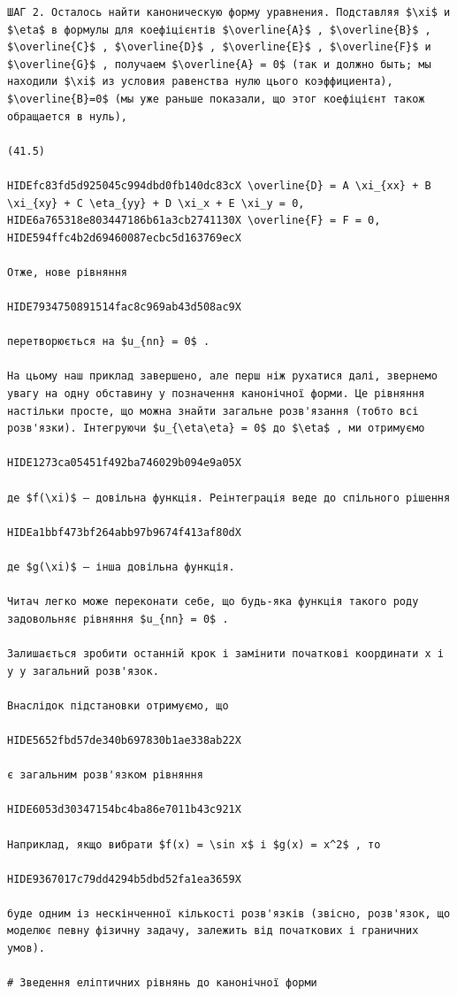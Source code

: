 \documentclass[
  ukrainian,
]{article}
\begin{document}
\begin{verbatim}
ШАГ 2. Осталось найти каноническую форму уравнения. Подставляя $\xi$ и $\eta$ в формулы для коефіцієнтів $\overline{A}$ , $\overline{B}$ , $\overline{C}$ , $\overline{D}$ , $\overline{E}$ , $\overline{F}$ и $\overline{G}$ , получаем $\overline{A} = 0$ (так и должно быть; мы находили $\xi$ из условия равенства нулю цього коэффициента), $\overline{B}=0$ (мы уже раньше показали, що этог коефіцієнт також обращается в нуль),

(41.5)

HIDEfc83fd5d925045c994dbd0fb140dc83cX \overline{D} = A \xi_{xx} + B \xi_{xy} + C \eta_{yy} + D \xi_x + E \xi_y = 0,
HIDE6a765318e803447186b61a3cb2741130X \overline{F} = F = 0,
HIDE594ffc4b2d69460087ecbc5d163769ecX

Отже, нове рівняння

HIDE7934750891514fac8c969ab43d508ac9X

перетворюється на $u_{nn} = 0$ .

На цьому наш приклад завершено, але перш ніж рухатися далі, звернемо увагу на одну обставину у позначення канонічної форми. Це рівняння настільки просте, що можна знайти загальне розв'язання (тобто всі розв'язки). Інтегруючи $u_{\eta\eta} = 0$ до $\eta$ , ми отримуємо

HIDE1273ca05451f492ba746029b094e9a05X

де $f(\xi)$ — довільна функція. Реінтеграція веде до спільного рішення

HIDEa1bbf473bf264abb97b9674f413af80dX

де $g(\xi)$ — інша довільна функція.

Читач легко може переконати себе, що будь-яка функція такого роду задовольняє рівняння $u_{nn} = 0$ .

Залишається зробити останній крок і замінити початкові координати x і y у загальний розв'язок.

Внаслідок підстановки отримуємо, що

HIDE5652fbd57de340b697830b1ae338ab22X

є загальним розв'язком рівняння

HIDE6053d30347154bc4ba86e7011b43c921X

Наприклад, якщо вибрати $f(x) = \sin x$ і $g(x) = x^2$ , то

HIDE9367017c79dd4294b5dbd52fa1ea3659X

буде одним із нескінченної кількості розв'язків (звісно, розв'язок, що моделює певну фізичну задачу, залежить від початкових і граничних умов).

# Зведення еліптичних рівнянь до канонічної форми


\end{verbatim}
\end{document}
